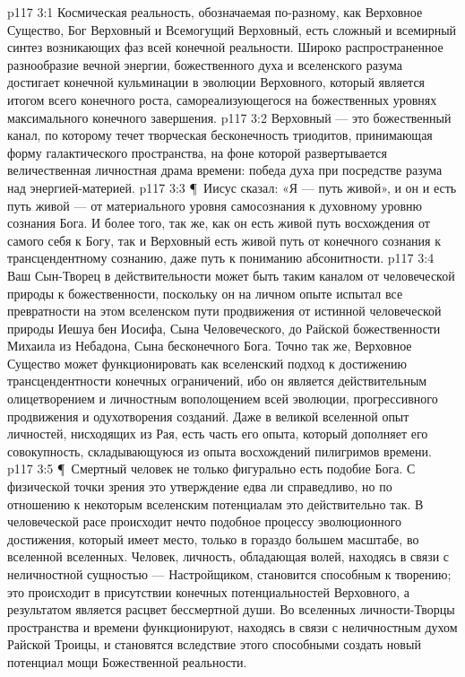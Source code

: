 \vs p117 3:1 Космическая реальность, обозначаемая по\hyp{}разному, как Верховное Существо, Бог Верховный и Всемогущий Верховный, есть сложный и всемирный синтез возникающих фаз всей конечной реальности. Широко распространенное разнообразие вечной энергии, божественного духа и вселенского разума достигает конечной кульминации в эволюции Верховного, который является итогом всего конечного роста, самореализующегося на божественных уровнях максимального конечного завершения.
\vs p117 3:2 Верховный --- это божественный канал, по которому течет творческая бесконечность триодитов, принимающая форму галактического пространства, на фоне которой развертывается величественная личностная драма времени: победа духа при посредстве разума над энергией\hyp{}материей.
\vs p117 3:3 \P\ Иисус сказал: «Я --- путь живой», и он и есть путь живой --- от материального уровня самосознания к духовному уровню сознания Бога. И более того, так же, как он есть живой путь восхождения от самого себя к Богу, так и Верховный есть живой путь от конечного сознания к трансцендентному сознанию, даже путь к пониманию абсонитности.
\vs p117 3:4 Ваш Сын\hyp{}Творец в действительности может быть таким каналом от человеческой природы к божественности, поскольку он на личном опыте испытал все превратности на этом вселенском пути продвижения от истинной человеческой природы Иешуа бен Иосифа, Сына Человеческого, до Райской божественности Михаила из Небадона, Сына бесконечного Бога. Точно так же, Верховное Существо может функционировать как вселенский подход к достижению трансцендентности конечных ограничений, ибо он является действительным олицетворением и личностным вополощением всей эволюции, прогрессивного продвижения и одухотворения созданий. Даже в великой вселенной опыт личностей, нисходящих из Рая, есть часть его опыта, который дополняет его совокупность, складывающуюся из опыта восхождений пилигримов времени.
\vs p117 3:5 \P\ Смертный человек не только фигурально есть подобие Бога. С физической точки зрения это утверждение едва ли справедливо, но по отношению к некоторым вселенским потенциалам это действительно так. В человеческой расе происходит нечто подобное процессу эволюционного достижения, который имеет место, только в гораздо большем масштабе, во вселенной вселенных. Человек, личность, обладающая волей, находясь в связи с неличностной сущностью --- Настройщиком, становится способным к творению; это происходит в присутствии конечных потенциальностей Верховного, а результатом является расцвет бессмертной души. Во вселенных личности\hyp{}Творцы пространства и времени функционируют, находясь в связи с неличностным духом Райской Троицы, и становятся вследствие этого способными создать новый потенциал мощи Божественной реальности.
